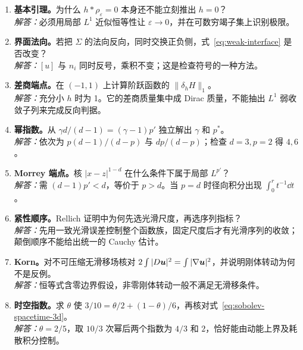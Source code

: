 \begin{enumerate}
 \item \textbf{基本引理。}为什么 $h*\rho_\varepsilon=0$ 本身还不能立刻推出 $h=0$？\\
 \textit{解答：}必须用局部 $L^1$ 近似恒等性让 $\varepsilon\to0$，并在可数穷竭子集上识别极限。
 \item \textbf{界面法向。}若把 $\Sigma$ 的法向反向，同时交换正负侧，式~\eqref{eq:weak-interface} 是否改变？\\
 \textit{解答：}$[u]$ 与 $n_i$ 同时反号，乘积不变；这是检查符号的一种方法。
 \item \textbf{差商端点。}在 $(-1,1)$ 上计算阶跃函数的 $\|\delta_hH\|_1$。\\
 \textit{解答：}充分小 $h$ 时为 1。它的差商质量集中成 Dirac 质量，不能抽出 $L^1$ 弱收敛子列来完成反向判据。
 \item \textbf{幂指数。}从 $\gamma d/(d-1)=(\gamma-1)p'$ 独立解出 $\gamma$ 和 $p^*$。\\
 \textit{解答：}依次为 $p(d-1)/(d-p)$ 与 $dp/(d-p)$；检查 $d=3,p=2$ 得 $4,6$。
 \item \textbf{Morrey 端点。}核 $|x-z|^{1-d}$ 在什么条件下属于局部 $L^{p'}$？\\
 \textit{解答：}需 $(d-1)p'<d$，等价于 $p>d$。当 $p=d$ 时径向积分出现 $\int_0^r t^{-1}\dd t$。
 \item \textbf{紧性顺序。}Rellich 证明中为何先选光滑尺度，再选序列指标？\\
 \textit{解答：}先用一致光滑误差控制整个函数族，固定尺度后才有光滑序列的收敛；颠倒顺序不能给出统一的 Cauchy 估计。
 \item \textbf{Korn。}对不可压缩无滑移场核对 $2\int|D\bm{u}|^2=\int|\nabla\bm{u}|^2$，并说明刚体转动为何不是反例。\\
 \textit{解答：}恒等式含零边界假设，非零刚体转动一般不满足无滑移条件。
 \item \textbf{时空指数。}求 $\theta$ 使 $3/10=\theta/2+(1-\theta)/6$，再核对式~\eqref{eq:sobolev-spacetime-3d}。\\
 \textit{解答：}$\theta=2/5$，取 $10/3$ 次幂后两个指数为 $4/3$ 和 $2$，恰好能由动能上界及耗散积分控制。
\end{enumerate}

